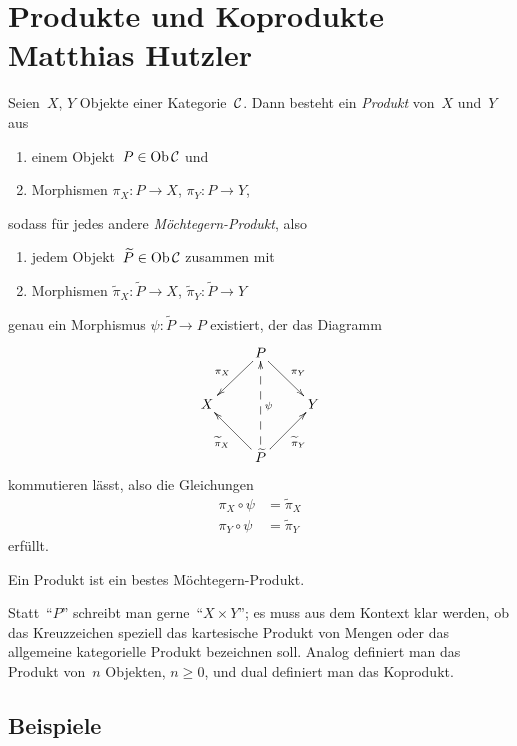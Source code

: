 \section[Produkte und Koprodukte]{Produkte und Koprodukte \hfill \small
Matthias Hutzler}

\begin{defn}Seien~$X$, $Y$ Objekte einer Kategorie~$\mathcal{C}$. Dann besteht ein
\emph{Produkt} von~$X$ und~$Y$ aus
\begin{enumerate}
\item einem Objekt~$P \in \operatorname{Ob} \mathcal{C}$ und
\item Morphismen $\pi_X : P \to X$, $\pi_Y : P \to Y$,
\end{enumerate}
sodass für jedes andere \emph{Möchtegern-Produkt}, also
\begin{enumerate}
\item jedem Objekt~$\widetilde P \in \operatorname{Ob} \mathcal{C}$ zusammen mit
\item Morphismen $\widetilde \pi_X : \widetilde P \to X$, $\widetilde\pi_Y :
\widetilde P \to Y$
\end{enumerate}
genau ein Morphismus $\psi : \widetilde P \to P$ existiert, der das Diagramm
\[ \xymatrix{
    & P \ar[ld]_{\pi_X} \ar[rd]^{\pi_Y} \\
  X & & Y \\
    & \widetilde P \ar[lu]^{\widetilde \pi_X} \ar@{-->}[uu]_\psi \ar[ru]_{\widetilde \pi_Y}
  } \]
kommutieren lässt, also die Gleichungen
\begin{align*}
  \pi_X \circ \psi &= \widetilde \pi_X \\
  \pi_Y \circ \psi &= \widetilde \pi_Y
\end{align*}
erfüllt.
\end{defn}

\begin{motto}Ein Produkt ist ein bestes Möchtegern-Produkt.\end{motto}

Statt~"`$P$"' schreibt man gerne~"`$X \times Y$"'; es muss aus dem Kontext klar
werden, ob das Kreuzzeichen speziell das kartesische Produkt von Mengen
oder das allgemeine kategorielle Produkt bezeichnen soll.
Analog definiert man das Produkt von~$n$ Objekten, $n \geq 0$, und dual
definiert man das Koprodukt.


\subsection{Beispiele}

